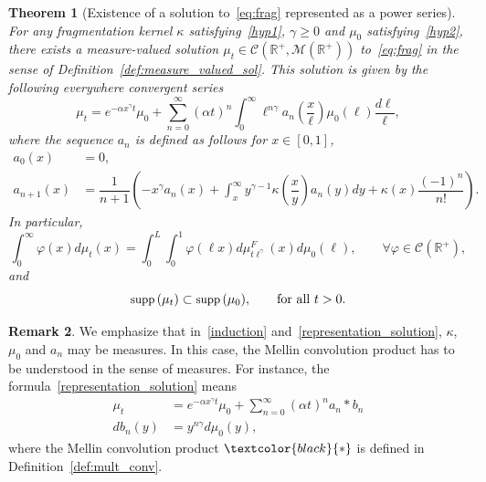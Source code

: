 \documentclass[10pt]{amsart}
\newtheorem{theo}{Theorem}[section]
\theoremstyle{definition}\newtheorem{defi}[theo]{Definition}\newtheorem{rema}[theo]{Remark}\newtheorem{exam}[theo]{Example}\newtheorem{exem}[theo]{Example}\newtheorem{nota}[theo]{Notation}
\newcommand*\dst{\displaystyle}
\renewcommand*\a{\alpha}
\newcommand*\R{\mathbb{R}}
\newcommand*\M{\mathcal{M}}
\newcommand{\clC}{\mathcal{C}}
\newcommand{\MT}[1]{\textcolor{black}{#1}}
\newcommand*\supp{{\mbox{\small\rm supp}}\,}
\let\oldforall\forall
\renewcommand*{\forall}{\mathrel{\oldforall}}
\begin{document}
\begin{theo}[Existence of a solution to~\eqref{eq:frag} represented as a power series]\label{thm:power_serie}
For any fragmentation kernel $\kappa $ satisfying~\eqref{hyp1}, $\gamma\geq 0$ and $\mu_0$ satisfying~\eqref{hyp2}, there exists a measure-valued solution $\mu_t\in\clC(\R^+,\M(\R^+))$ to~\eqref{eq:frag} in the sense of Definition~\ref{def:measure_valued_sol}. This solution is given by the following everywhere convergent series
\begin{equation}\label{representation_solution}
\mu_t = e^{-\a x^{\gamma}t} \mu_0 + \sum_{n=0}^{\infty} (\a t)^n
\dst\int_0^{\infty} \ell^{n\gamma}a_n\left(\dfrac{x}{\ell}\right)\mu_0(\ell) \dfrac{d\ell}\ell{},
\end{equation}
where the sequence $a_n$ is defined as follows for $x\in [0,1]$,
\begin{equation}\label{induction}
\begin{split}
a_0(x) &=0, \\
 a_{n+1}(x) &= \dfrac{1}{n+1}\left(-x^{\gamma}a_n(x)+ \dst\int_x^{\infty} y^{\gamma-1} \kappa \left(\dfrac{x}{y} \right)a_n(y)dy + \kappa(x) \dfrac{(-1)^n}{n!}\right).
\end{split}
\end{equation}
In particular,
\begin{equation}\label{weakform}
\dst\int_0^{\infty} \varphi(x) d\mu_t(x) = \dst\int_0^{L} \dst\int_0^{1} \varphi(\ell x) d \mu_{t\ell^{\gamma}}^{F} (x)d\mu_0(\ell),\qquad \forall \varphi\in \clC(\R^+),
\end{equation}
and
\begin{equation}
\supp(\mu_t)\subset \supp(\mu_0), \qquad \text{for all } t>0.
\end{equation}

\end{theo}



\begin{rema}\label{remark1}
We emphasize that in~\eqref{induction} and~\eqref{representation_solution}, $\kappa$, $\mu_0$ and $a_n$ may be measures. In this case, the Mellin convolution product has to be understood in the sense of measures. For instance, the formula~\eqref{representation_solution} means
\begin{align}
\mu_t &= e^{-\a x^{\gamma}t} \mu_0 + \sum_{n=0}^{\infty} (\a t)^n a_n \ast b_n \label{remark1E1}
\\
 db_n(y) &=y^{n\gamma } d\mu _0(y), \label{remark1E2}
\end{align}
where the Mellin convolution product $\MT{\ast}$ is defined in Definition~\ref{def:mult_conv}.
\end{rema}
\end{document}
